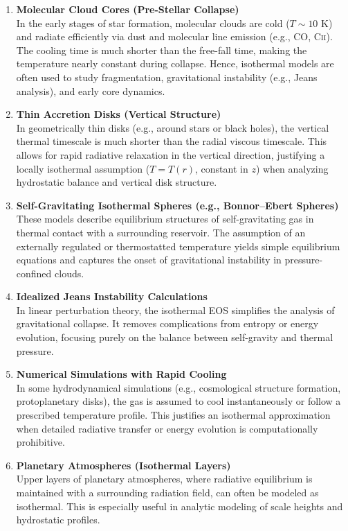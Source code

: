 \begin{enumerate}
    \item \textbf{Molecular Cloud Cores (Pre-Stellar Collapse)}\\
    In the early stages of star formation, molecular clouds are cold (\( T \sim 10 \) K) and radiate efficiently via dust and molecular line emission (e.g., CO, C\textsc{ii}). The cooling time is much shorter than the free-fall time, making the temperature nearly constant during collapse. Hence, isothermal models are often used to study fragmentation, gravitational instability (e.g., Jeans analysis), and early core dynamics.

    \item \textbf{Thin Accretion Disks (Vertical Structure)}\\
    In geometrically thin disks (e.g., around stars or black holes), the vertical thermal timescale is much shorter than the radial viscous timescale. This allows for rapid radiative relaxation in the vertical direction, justifying a locally isothermal assumption (\( T = T(r) \), constant in \( z \)) when analyzing hydrostatic balance and vertical disk structure.

    \item \textbf{Self-Gravitating Isothermal Spheres (e.g., Bonnor–Ebert Spheres)}\\
    These models describe equilibrium structures of self-gravitating gas in thermal contact with a surrounding reservoir. The assumption of an externally regulated or thermostatted temperature yields simple equilibrium equations and captures the onset of gravitational instability in pressure-confined clouds.

    \item \textbf{Idealized Jeans Instability Calculations}\\
    In linear perturbation theory, the isothermal EOS simplifies the analysis of gravitational collapse. It removes complications from entropy or energy evolution, focusing purely on the balance between self-gravity and thermal pressure.

    \item \textbf{Numerical Simulations with Rapid Cooling}\\
    In some hydrodynamical simulations (e.g., cosmological structure formation, protoplanetary disks), the gas is assumed to cool instantaneously or follow a prescribed temperature profile. This justifies an isothermal approximation when detailed radiative transfer or energy evolution is computationally prohibitive.

    \item \textbf{Planetary Atmospheres (Isothermal Layers)}\\
    Upper layers of planetary atmospheres, where radiative equilibrium is maintained with a surrounding radiation field, can often be modeled as isothermal. This is especially useful in analytic modeling of scale heights and hydrostatic profiles.

\end{enumerate}

